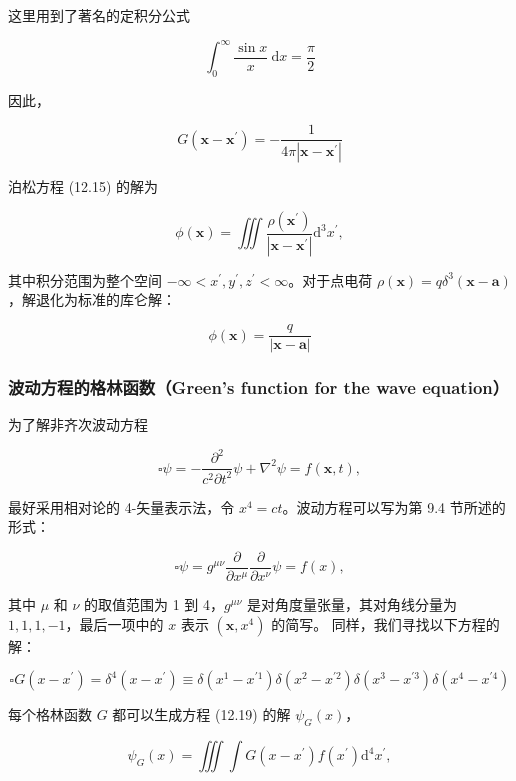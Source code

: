 这里用到了著名的定积分公式

\[\int_{0}^{\infty}\frac{\sin x}{x}\mathrm{\: d}x = \frac{\pi}{2}\]

因此，

\[G\left( \mathbf{x} - \mathbf{x}^{\prime} \right) = - \frac{1}{4\pi\left| \mathbf{x} - \mathbf{x}^{\prime} \right|}\]

泊松方程 (12.15) 的解为

\[\phi\left( \mathbf{x} \right) = \iiint\frac{\rho\left( \mathbf{x}^{\prime} \right)}{\left| \mathbf{x} - \mathbf{x}^{\prime} \right|}\mathrm{d}^{3}x^{\prime},\]

其中积分范围为整个空间
\(- \infty < x^{\prime},y^{\prime},z^{\prime} < \infty\)。对于点电荷
\(\rho\left( \mathbf{x} \right) = q\delta^{3}\left( \mathbf{x} - \mathbf{a} \right)\)，解退化为标准的库仑解：

\[\phi\left( \mathbf{x} \right) = \frac{q}{\left| \mathbf{x} - \mathbf{a} \right|}\]

\subsubsection{波动方程的格林函数（Green's function for the wave
equation）}\label{ux6ce2ux52a8ux65b9ux7a0bux7684ux683cux6797ux51fdux6570greens-function-for-the-wave-equation}

为了解非齐次波动方程

\[▫\psi = - \frac{\partial^{2}}{c^{2}\partial t^{2}}\psi + \nabla^{2}\psi = f\left( \mathbf{x},t \right),\]

最好采用相对论的 4-矢量表示法，令 \(x^{4} = ct\)。波动方程可以写为第 9.4
节所述的形式：

\[▫\psi = g^{\mu\nu}\frac{\partial}{\partial x^{\mu}}\frac{\partial}{\partial x^{\nu}}\psi = f(x),\]

其中 \(\mu\) 和 \(\nu\) 的取值范围为 1 到 4，\(g^{\mu\nu}\)
是对角度量张量，其对角线分量为 \(1,1,1, - 1\)，最后一项中的 \(x\) 表示
\(\left( \mathbf{x},x^{4} \right)\) 的简写。
同样，我们寻找以下方程的解：

\[▫G\left( x - x^{\prime} \right) = \delta^{4}\left( x - x^{\prime} \right) \equiv \delta\left( x^{1} - x^{\prime 1} \right)\delta\left( x^{2} - x^{\prime 2} \right)\delta\left( x^{3} - x^{\prime 3} \right)\delta\left( x^{4} - x^{\prime 4} \right)\]

每个格林函数 \(G\) 都可以生成方程 (12.19) 的解 \(\psi_{G}(x)\)，

\[\psi_{G}(x) = \iiint\int G\left( x - x^{\prime} \right)f\left( x^{\prime} \right)\mathrm{d}^{4}x^{\prime},\]

